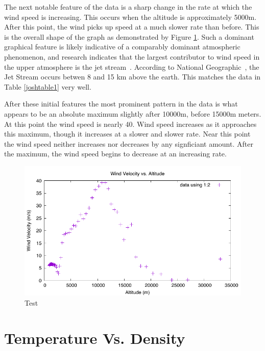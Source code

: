 \documentclass{article}
\begin{document}
The next notable feature of the data is a sharp change in the rate at which the wind speed is increasing.  This occurs when the altitude is approximately 5000\si{m}. After this point, the wind picks up speed at a much slower rate than before.  This is the overall shape of the graph as demonstrated by Figure \ref{josh1}.  Such a dominant graphical feature is likely indicative of a comparably dominant atmospheric phenomenon, and research indicates that the largest contributor to wind speed in the upper atmosphere is the jet stream~\cite{National-Geographic}.  According to National Geographic~\cite{National-Geographic}, the Jet Stream occurs betwen 8 and 15 \si{km} above the earth.  This matches the data in Table \ref{joshtable1} very well.

After these initial features the most prominent pattern in the data is what appears to be an absolute maximum slightly after 10000\si{m}, before 15000\si{m} meters.  At this point the wind speed is nearly 40\si{}.  Wind speed increases as it approaches this maximum, though it increases at a slower and slower rate. Near this point the wind speed neither increases nor decreases by any signficiant amount.  After the maximum, the wind speed begins to decrease at an increasing rate.


\begin{figure}
\centering
\includegraphics{josh-data/figure1.pdf}
\caption{Test}
\label{josh1}

\end{figure}


\part{Temperature Vs. Density}
\end{document}

